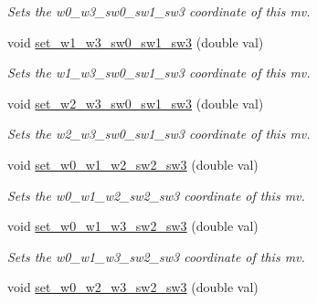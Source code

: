 \begin{DoxyCompactItemize}
\begin{DoxyCompactList}\small\item\em Sets the w0\-\_\-w3\-\_\-sw0\-\_\-sw1\-\_\-sw3 coordinate of this mv. \end{DoxyCompactList}\item 
\hypertarget{classe3ga_1_1mv_a2035f08229016b5f9b9ad5cbcfdf5163}{void \hyperlink{classe3ga_1_1mv_a2035f08229016b5f9b9ad5cbcfdf5163}{set\-\_\-w1\-\_\-w3\-\_\-sw0\-\_\-sw1\-\_\-sw3} (double val)}\label{classe3ga_1_1mv_a2035f08229016b5f9b9ad5cbcfdf5163}

\begin{DoxyCompactList}\small\item\em Sets the w1\-\_\-w3\-\_\-sw0\-\_\-sw1\-\_\-sw3 coordinate of this mv. \end{DoxyCompactList}\item 
\hypertarget{classe3ga_1_1mv_aca9ac10142ba8ad665d1ca49f0590830}{void \hyperlink{classe3ga_1_1mv_aca9ac10142ba8ad665d1ca49f0590830}{set\-\_\-w2\-\_\-w3\-\_\-sw0\-\_\-sw1\-\_\-sw3} (double val)}\label{classe3ga_1_1mv_aca9ac10142ba8ad665d1ca49f0590830}

\begin{DoxyCompactList}\small\item\em Sets the w2\-\_\-w3\-\_\-sw0\-\_\-sw1\-\_\-sw3 coordinate of this mv. \end{DoxyCompactList}\item 
\hypertarget{classe3ga_1_1mv_a85b59bddf94c51f5a7532ebd58c880b4}{void \hyperlink{classe3ga_1_1mv_a85b59bddf94c51f5a7532ebd58c880b4}{set\-\_\-w0\-\_\-w1\-\_\-w2\-\_\-sw2\-\_\-sw3} (double val)}\label{classe3ga_1_1mv_a85b59bddf94c51f5a7532ebd58c880b4}

\begin{DoxyCompactList}\small\item\em Sets the w0\-\_\-w1\-\_\-w2\-\_\-sw2\-\_\-sw3 coordinate of this mv. \end{DoxyCompactList}\item 
\hypertarget{classe3ga_1_1mv_a1b71c44a22923a19203979a1afc8d2fc}{void \hyperlink{classe3ga_1_1mv_a1b71c44a22923a19203979a1afc8d2fc}{set\-\_\-w0\-\_\-w1\-\_\-w3\-\_\-sw2\-\_\-sw3} (double val)}\label{classe3ga_1_1mv_a1b71c44a22923a19203979a1afc8d2fc}

\begin{DoxyCompactList}\small\item\em Sets the w0\-\_\-w1\-\_\-w3\-\_\-sw2\-\_\-sw3 coordinate of this mv. \end{DoxyCompactList}\item 
\hypertarget{classe3ga_1_1mv_a8e7467d2d7dac3392d1605f53a9edb1d}{void \hyperlink{classe3ga_1_1mv_a8e7467d2d7dac3392d1605f53a9edb1d}{set\-\_\-w0\-\_\-w2\-\_\-w3\-\_\-sw2\-\_\-sw3} (double val)}\label{classe3ga_1_1mv_a8e7467d2d7dac3392d1605f53a9edb1d}


\end{DoxyCompactItemize}
